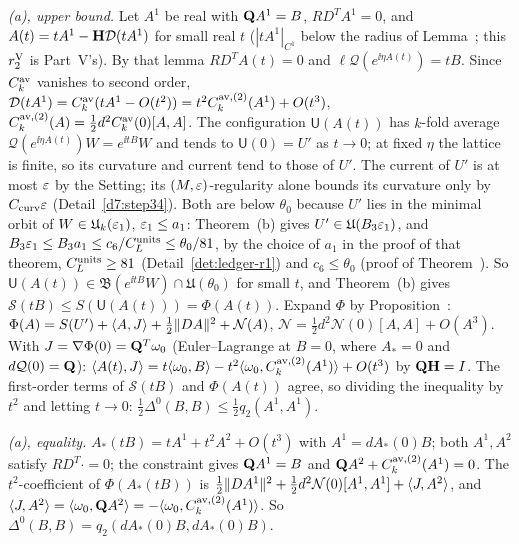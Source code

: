 \begin{detail}\label{d7:hessian}
\begin{step}
\emph{(a), upper bound.} Let $A^1$ be real with $\mathbf Q A^1=B$, $RD^TA^1=0$, and $A(t)=tA^1-\mathbf H\mathcal D(tA^1)$ for small real $t$ ($|tA^1|_{C^1}$ below the radius of Lemma~; this $r_2^{\rm V}$ is Part~V's). By that lemma $RD^TA(t)=0$ and $\ell\mathcal Q(e^{\ii\eta A(t)})=tB$. Since $C^{\rm av}_k$ vanishes to second order, $\mathcal D(tA^1)=C^{\rm av}_k(tA^1-O(t^2))=t^2C^{{\rm av},(2)}_k(A^1)+O(t^3)$, $C^{{\rm av},(2)}_k(A)=\frac12d^2C^{\rm av}_k(0)[A,A]$. The configuration $\mathsf U(A(t))$ has $k$-fold average $\mathcal Q(e^{\ii\eta A(t)})W=e^{\ii tB}W$ and tends to $\mathsf U(0)=U'$ as $t\to0$; at fixed $\eta$ the lattice is finite, so its curvature and current tend to those of $U'$. The current of $U'$ is at most $\varepsilon$ by the Setting; its $(M,\varepsilon)$-regularity alone bounds its curvature only by $C_{\rm curv}\varepsilon$ (Detail~\ref{d7:step34}). Both are below $\theta_0$ because $U'$ lies in the minimal orbit of $W\in\mathfrak U_k(\varepsilon_1)$, $\varepsilon_1\le a_1$: Theorem~(b) gives $U'\in\mathfrak U(B_3\varepsilon_1)$, and $B_3\varepsilon_1\le B_3a_1\le c_6/C^{\rm units}_L\le\theta_0/81$, by the choice of $a_1$ in the proof of that theorem, $C^{\rm units}_L\ge81$ (Detail~\ref{det:ledger-r1}) and $c_6\le\theta_0$ (proof of Theorem~). So $\mathsf U(A(t))\in\mathfrak B(e^{\ii tB}W)\cap\mathfrak U(\theta_0)$ for small $t$, and Theorem~(b) gives $\mathcal S(tB)\le S(\mathsf U(A(t)))=\Phi(A(t))$. Expand $\Phi$ by Proposition~: $\Phi(A)=S(U')+\langle A,J\rangle+\frac12\|DA\|^2+\mathcal N(A)$, $\mathcal N=\frac12d^2\mathcal N(0)[A,A]+O(A^3)$. With $J=\nabla\Phi(0)=\mathbf Q^T\omega_0$ (Euler--Lagrange at $B=0$, where $A_*=0$ and $d\mathcal Q(0)=\mathbf Q$): $\langle A(t),J\rangle=t\langle \omega_0,B\rangle-t^2\langle \omega_0,C^{{\rm av},(2)}_k(A^1)\rangle+O(t^3)$ by $\mathbf Q\mathbf H=I$. The first-order terms of $\mathcal S(tB)$ and $\Phi(A(t))$ agree, so dividing the inequality by $t^2$ and letting $t\to0$: $\frac12\Delta^0(B,B)\le\frac12q_2(A^1,A^1)$.
\end{step}
\begin{step}
\emph{(a), equality.} $A_*(tB)=tA^1+t^2A^2+O(t^3)$ with $A^1=dA_*(0)B$; both $A^1,A^2$ satisfy $RD^T\cdot=0$; the constraint gives $\mathbf Q A^1=B$ and $\mathbf Q A^2+C^{{\rm av},(2)}_k(A^1)=0$. The $t^2$-coefficient of $\Phi(A_*(tB))$ is $\frac12\|DA^1\|^2+\frac12d^2\mathcal N(0)[A^1,A^1]+\langle J,A^2\rangle$, and $\langle J,A^2\rangle=\langle \omega_0,\mathbf Q A^2\rangle=-\langle \omega_0,C^{{\rm av},(2)}_k(A^1)\rangle$. So $\Delta^0(B,B)=q_2(dA_*(0)B,dA_*(0)B)$.

\end{step}
\end{detail}
